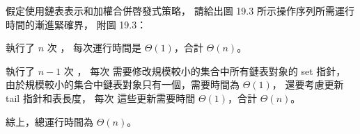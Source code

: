 \startEXERCISE
假定使用鏈表表示和加權合併啓發式策略，
請給出圖 19.3 所示操作序列所需運行時間的漸進緊確界，
附圖 19.3：
\stopEXERCISE

\startANSWER
執行了 $n$ 次 ，
每次運行時間是 $\Theta(1)$，合計 $\Theta(n)$。

執行了 $n-1$ 次 ，
每次  需要修改規模較小的集合中所有鏈表對象的 set 指針，
由於規模較小的集合中鏈表對象只有一個，需要時間為 $\Theta(1)$，
還要考慮更新 tail 指針和表長度，
每次  這些更新需要時間 $\Theta(1)$，合計 $\Theta(n)$。

綜上，總運行時間為 $\Theta(n)$。
\stopANSWER